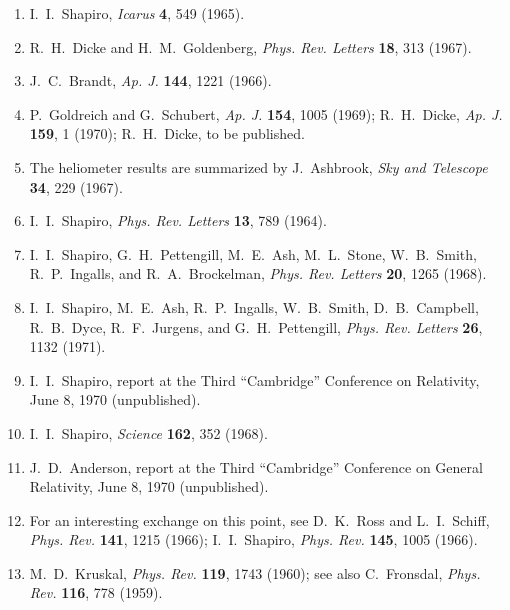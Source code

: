 \begin{enumerate}
  \item {}\label{ch8-ref-8}
  I.~I.~Shapiro, \emph{Icarus} \textbf{4}, 549 (1965).

  \item {}\label{ch8-ref-9}
  R.~H.~Dicke and H.~M.~Goldenberg, \emph{Phys. Rev. Letters}
  \textbf{18}, 313 (1967).

  \item {}\label{ch8-ref-10}
  J.~C.~Brandt, \emph{Ap. J.} \textbf{144}, 1221 (1966).

  \item {}\label{ch8-ref-11}
  P.~Goldreich and G.~Schubert, \emph{Ap. J.} \textbf{154}, 1005 (1969);
  R.~H.~Dicke, \emph{Ap. J.} \textbf{159}, 1 (1970);
  R.~H.~Dicke, to be published.

  \item {}\label{ch8-ref-12}
  The heliometer results are summarized by J.~Ashbrook,
  \emph{Sky and Telescope} \textbf{34}, 229 (1967).

  \item {}\label{ch8-ref-13}
  I.~I.~Shapiro, \emph{Phys. Rev. Letters} \textbf{13}, 789 (1964).

  \item {}\label{ch8-ref-14}
  I.~I.~Shapiro, G.~H.~Pettengill, M.~E.~Ash, M.~L.~Stone, W.~B.~Smith,
  R.~P.~Ingalls, and R.~A.~Brockelman, \emph{Phys. Rev. Letters}
  \textbf{20}, 1265 (1968).

  \item {}\label{ch8-ref-15}
  I.~I.~Shapiro, M.~E.~Ash, R.~P.~Ingalls, W.~B.~Smith, D.~B.~Campbell,
  R.~B.~Dyce, R.~F.~Jurgens, and G.~H.~Pettengill,
  \emph{Phys. Rev. Letters} \textbf{26}, 1132 (1971).

  \item {}\label{ch8-ref-16}
  I.~I.~Shapiro, report at the Third ``Cambridge'' Conference on
  Relativity, June 8, 1970 (unpublished).

  \item {}\label{ch8-ref-17}
  I.~I.~Shapiro, \emph{Science} \textbf{162}, 352 (1968).

  \item {}\label{ch8-ref-18}
  J.~D.~Anderson, report at the Third ``Cambridge'' Conference on General
  Relativity, June 8, 1970 (unpublished).

  \item {}\label{ch8-ref-19}
  For an interesting exchange on this point, see D.~K.~Ross and
  L.~I.~Schiff, \emph{Phys. Rev.} \textbf{141}, 1215 (1966);
  I.~I.~Shapiro, \emph{Phys. Rev.} \textbf{145}, 1005 (1966).

  \item {}\label{ch8-ref-20}
  M.~D.~Kruskal, \emph{Phys. Rev.} \textbf{119}, 1743 (1960); see also
  C.~Fronsdal, \emph{Phys. Rev.} \textbf{116}, 778 (1959).
\end{enumerate}
